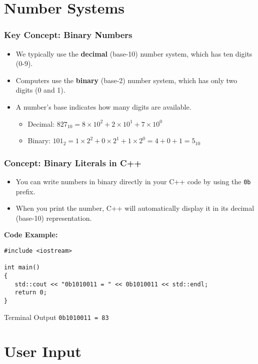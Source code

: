 \documentclass{beamer}
\begin{document}
\section{Number Systems}

\begin{frame}
\frametitle{Key Concept: Binary Numbers}
\begin{itemize}
    \item We typically use the \textbf{decimal} (base-10) number system, which has ten digits (0-9).
    \item Computers use the \textbf{binary} (base-2) number system, which has only two digits (0 and 1).
    \item A number's base indicates how many digits are available.
    \begin{itemize}
        \item Decimal: $827_{10} = 8 \times 10^2 + 2 \times 10^1 + 7 \times 10^0$
        \item Binary: $101_2 = 1 \times 2^2 + 0 \times 2^1 + 1 \times 2^0 = 4 + 0 + 1 = 5_{10}$
    \end{itemize}
\end{itemize}
\end{frame}

\begin{frame}[fragile]
\frametitle{Concept: Binary Literals in C++}
\begin{itemize}
    \item You can write numbers in binary directly in your C++ code by using the \texttt{0b} prefix.
    \item When you print the number, C++ will automatically display it in its decimal (base-10) representation.
\end{itemize}
\vspace{1em}
\textbf{Code Example:}
\begin{verbatim}
#include <iostream>

int main()
{
   std::cout << "0b1010011 = " << 0b1010011 << std::endl;
   return 0;
}
\end{verbatim}
\pause
\begin{block}{Terminal Output}
\texttt{0b1010011 = 83}
\end{block}
\end{frame}

\section{User Input}
\end{document}
